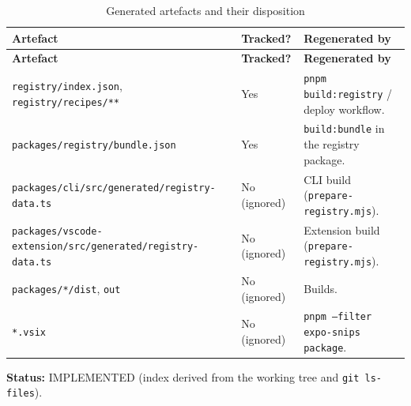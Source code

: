 \begin{longtable}{@{}L{6.2cm}L{3cm}L{5.2cm}@{}}
\caption{Generated artefacts and their disposition}\\
\toprule
\textbf{Artefact} & \textbf{Tracked?} & \textbf{Regenerated by} \\
\midrule
\endfirsthead
\toprule
\textbf{Artefact} & \textbf{Tracked?} & \textbf{Regenerated by} \\
\midrule
\endhead
\texttt{registry/index.json}, \texttt{registry/recipes/**} & Yes & \texttt{pnpm
build:registry} / deploy workflow. \\
\texttt{packages/registry/bundle.json} & Yes & \texttt{build:bundle} in the registry
package. \\
\texttt{packages/cli/src/generated/registry-data.ts} & No (ignored) & CLI build
(\texttt{prepare-registry.mjs}). \\
\texttt{packages/vscode-extension/src/generated/registry-data.ts} & No (ignored) &
Extension build (\texttt{prepare-registry.mjs}). \\
\texttt{packages/*/dist}, \texttt{out} & No (ignored) & Builds. \\
\texttt{*.vsix} & No (ignored) & \texttt{pnpm --filter expo-snips package}. \\
\bottomrule
\end{longtable}

\textbf{Status:} IMPLEMENTED (index derived from the working tree and
\texttt{git ls-files}).
